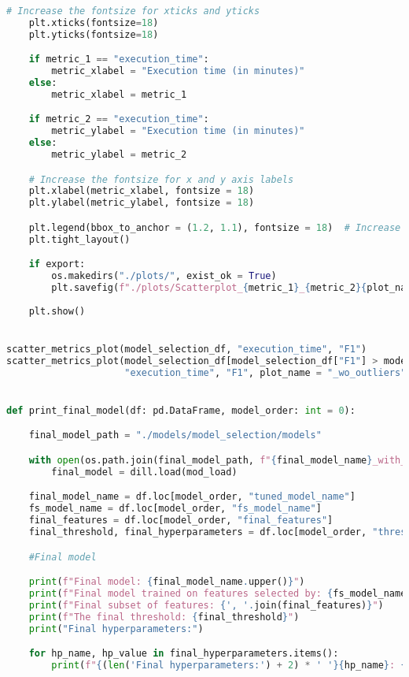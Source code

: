 \begin{lstlisting}[language=Python, basicstyle=\footnotesize\ttfamily]
    # Increase the fontsize for xticks and yticks
    plt.xticks(fontsize=18)
    plt.yticks(fontsize=18)

    if metric_1 == "execution_time":
        metric_xlabel = "Execution time (in minutes)"
    else:
        metric_xlabel = metric_1

    if metric_2 == "execution_time":
        metric_ylabel = "Execution time (in minutes)"
    else:
        metric_ylabel = metric_2

    # Increase the fontsize for x and y axis labels
    plt.xlabel(metric_xlabel, fontsize = 18)
    plt.ylabel(metric_ylabel, fontsize = 18)

    plt.legend(bbox_to_anchor = (1.2, 1.1), fontsize = 18)  # Increase the fontsize for the legend
    plt.tight_layout()

    if export:
        os.makedirs("./plots/", exist_ok = True)
        plt.savefig(f"./plots/Scatterplot_{metric_1}_{metric_2}{plot_name}.jpg", dpi = 300)
    
    plt.show()


scatter_metrics_plot(model_selection_df, "execution_time", "F1")
scatter_metrics_plot(model_selection_df[model_selection_df["F1"] > model_selection_df["F1"].min()],
                     "execution_time", "F1", plot_name = "_wo_outliers")


def print_final_model(df: pd.DataFrame, model_order: int = 0):

    final_model_path = "./models/model_selection/models"

    with open(os.path.join(final_model_path, f"{final_model_name}_with_{fs_model_name}.h5"), "rb") as mod_load:
        final_model = dill.load(mod_load)

    final_model_name = df.loc[model_order, "tuned_model_name"]
    fs_model_name = df.loc[model_order, "fs_model_name"]
    final_features = df.loc[model_order, "final_features"]
    final_threshold, final_hyperparameters = df.loc[model_order, "threshold"], final_model.get_params()

    #Final model

    print(f"Final model: {final_model_name.upper()}")
    print(f"Final model trained on features selected by: {fs_model_name.upper()}")
    print(f"Final subset of features: {', '.join(final_features)}")
    print(f"The final threshold: {final_threshold}")
    print("Final hyperparameters:")

    for hp_name, hp_value in final_hyperparameters.items():
        print(f"{(len('Final hyperparameters:') + 2) * ' '}{hp_name}: {hp_value}")



\end{lstlisting}
